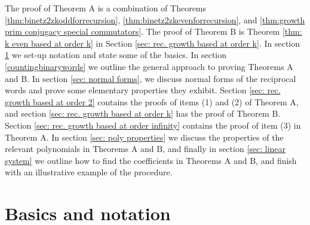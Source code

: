 \documentclass[11pt]{amsart}
\numberwithin{equation}{section}
\theoremstyle{plain}
\begin{document}
  \vskip5pt
   The proof of Theorem 
  $\text{A}$   is a combination of Theorems
  \ref{thm:binetz2zkoddforrecursion}, \ref{thm:binetz2zkevenforrecursion}, and \ref{thm:growth prim conjugacy special commutators}.   The proof of     
 Theorem  $\text{B}$  is  Theorem  \ref{thm: k even based at order k} in Section \ref{sec: rec. growth based at order k}.
  In section \ref{sec:basics and notation} we set-up notation and state  some of the basics. In section \ref{countingbinarywords}
we outline the general approach to proving Theorems A and B.
In section \ref{sec: normal forms}, we discuss normal forms of the reciprocal words and prove some elementary properties 
they exhibit. Section  \ref{sec: rec. growth based at order 2}
contains  the proofs of  items (1) and (2) of Theorem $\text{A}$, and section  \ref{sec: rec. growth based at order k} has the proof of Theorem $\text{B}$. Section \ref{sec: rec. growth based at order infinity} contains the proof of  item (3) in Theorem A. In section \ref{sec: poly properties} we discuss the properties of the relevant polynomials in Theorems  $\text{A}$ and $\text{B}$, and finally in section \ref{sec: linear system} we   outline  how to find the coefficients in Theorems $\text{A}$ and $\text{B}$,
and finish with an illustrative example of the procedure. 



 



\section{Basics and  notation} \label{sec:basics and notation}
\end{document}
